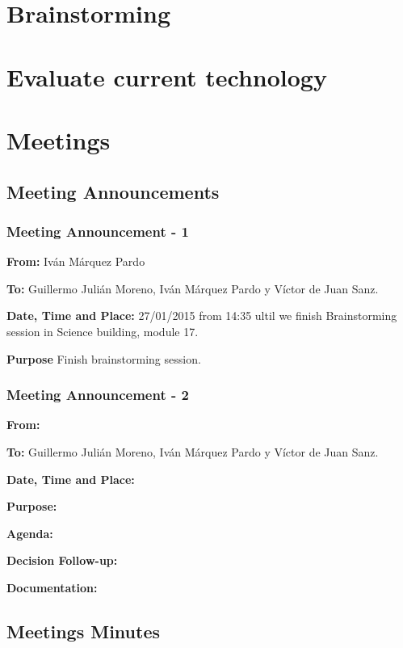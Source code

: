 \documentclass{report}
\begin{document}
\chapter{Brainstorming}




\chapter{Evaluate current technology}

\chapter{Meetings}


\section{Meeting Announcements}
\subsection{Meeting Announcement - 1}

\textbf{From: } Iván Márquez Pardo

\textbf{To: } Guillermo Julián Moreno, Iván Márquez Pardo y Víctor de Juan Sanz.

\textbf{Date, Time and Place: } 27/01/2015 from 14:35 ultil we finish Brainstorming session in Science building, module 17.

\textbf{Purpose} Finish brainstorming session.

\subsection{Meeting Announcement - 2}


\textbf{From: }

\textbf{To: } Guillermo Julián Moreno, Iván Márquez Pardo y Víctor de Juan Sanz.


\textbf{Date, Time and Place: }


\textbf{Purpose: }


\textbf{Agenda: }

\textbf{Decision Follow-up: }


\textbf{Documentation: }


\section{Meetings Minutes}
\end{document}
